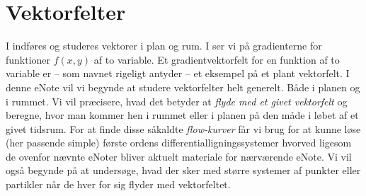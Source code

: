 

\setcounter{chapter}{23} %



%
%
%
%
%
%


\chapter{Vektorfelter} \label{tn24}


\begin{basis}
I   indføres og studeres vektorer i plan og rum. I  ser vi på gradienterne for funktioner $f(x,y)$ af to variable. Et gradientvektorfelt for en funktion af to variable er -- som navnet rigeligt antyder -- et eksempel på et plant vektorfelt. I denne eNote vil vi begynde at studere vektorfelter helt generelt. Både i planen og i rummet. Vi vil præcisere, hvad det betyder at \emph{flyde med et givet vektorfelt} og beregne, hvor man kommer hen i rummet  eller i planen på den måde i løbet af et givet tidsrum. For at finde disse såkaldte \emph{flow-kurver} får vi  brug for at kunne løse (her passende simple) første ordens differentialligningssystemer hvorved  ligesom de ovenfor nævnte eNoter bliver aktuelt materiale for nærværende eNote. Vi vil også begynde på at undersøge, hvad der sker med større systemer af punkter eller partikler når de hver for sig flyder med vektorfeltet.
\end{basis}



